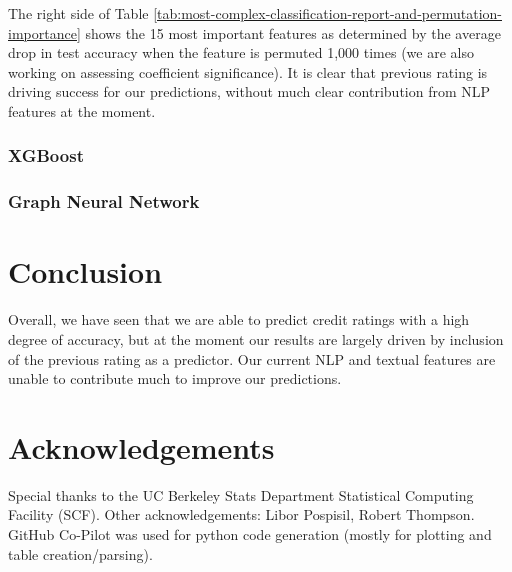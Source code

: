 \documentclass{article}[11pt]
\begin{document}
    The right side of Table \ref{tab:most-complex-classification-report-and-permutation-importance} shows the 15 most important features as determined by the average drop in test accuracy when the feature is permuted 1,000 times (we are also working on assessing coefficient significance). It is clear that previous rating is driving success for our predictions, without much clear contribution from NLP features at the moment.


    \subsubsection*{XGBoost}

    \subsubsection*{Graph Neural Network}

    \section*{Conclusion}

    Overall, we have seen that we are able to predict credit ratings with a high degree of accuracy, but at the moment our results are largely driven by inclusion of the previous rating as a predictor. Our current NLP and textual features are unable to contribute much to improve our predictions. 

    \section*{Acknowledgements}

    Special thanks to the UC Berkeley Stats Department Statistical Computing Facility (SCF). Other acknowledgements: Libor Pospisil, Robert Thompson. GitHub Co-Pilot was used for python code generation (mostly for plotting and table creation/parsing).

    \clearpage
    \newpage

    
    
\end{document}
